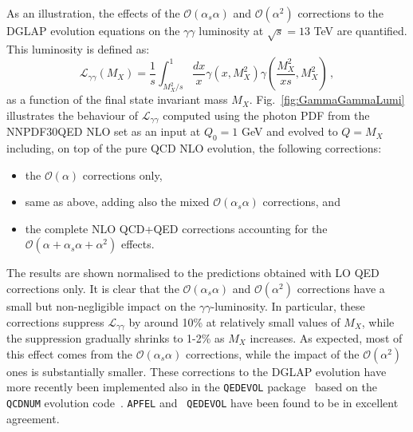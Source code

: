 As an illustration, the effects of the $\mathcal{O}(\alpha_s\alpha)$
and $\mathcal{O}(\alpha^2)$ corrections to the DGLAP evolution
equations on the $\gamma\gamma$ luminosity at $\sqrt{s} = 13$ TeV are
quantified. This luminosity is defined as:
\begin{equation}\label{eq:GammaGammaLumi}
  \mathcal{L}_{\gamma\gamma}(M_X) = \frac1{s}\int_{M_X^2/s}^1
  \frac{dx}{x} \gamma(x,M_X^2) \gamma\left(\frac{M_X^2}{xs},M_X^2\right)\,,
\end{equation}
as a function of the final state invariant mass
$M_X$. Fig.~\ref{fig:GammaGammaLumi} illustrates the behaviour of
$\mathcal{L}_{\gamma\gamma}$ computed using the photon PDF from the
NNPDF30QED NLO set as an input at $Q_0 = 1$ GeV and evolved to $Q=M_X$
including, on top of the pure QCD NLO evolution, the following
corrections:
\begin{itemize}
\item the $\mathcal{O}(\alpha)$ corrections only,
\item same as above, adding also the mixed
  $\mathcal{O}(\alpha_s\alpha)$ corrections, and
\item the complete NLO QCD+QED corrections accounting for the
  $\mathcal{O}(\alpha+\alpha_s\alpha+\alpha^2)$ effects.
\end{itemize}
The results are shown normalised to the predictions obtained with LO
QED corrections only. It is clear that the
$\mathcal{O}(\alpha_s\alpha)$ and $\mathcal{O}(\alpha^2)$ corrections
have a small but non-negligible impact on the
$\gamma\gamma$-luminosity. In particular, these corrections suppress
$\mathcal{L}_{\gamma\gamma}$ by around 10\% at relatively small values
of $M_X$, while the suppression gradually shrinks to 1-2\% as $M_X$
increases. As expected, most of this effect comes from the
$\mathcal{O}(\alpha_s\alpha)$ corrections, while the impact of the
$\mathcal{O}(\alpha^2)$ ones is substantially smaller.  These
corrections to the DGLAP evolution have more recently been implemented
also in the {\tt QEDEVOL} package~\cite{Sadykov:2014aua} based on the
{\tt QCDNUM} evolution code~\cite{Botje:2010ay}. {\tt APFEL} and {\tt
  QEDEVOL} have been found to be in excellent agreement.

